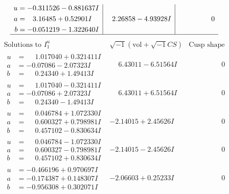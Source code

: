 \documentclass[1p]{elsarticle_modified}
\theoremstyle{definition}
\newcommand{\I}{\sqrt{-1}}
\begin{document}
$$\begin{array}{c|c|c}
\begin{aligned}
u &= -0.311526 - 0.881637 I \\
a &= \phantom{-}3.16485 + 0.52901 I \\
b &= -0.051219 - 1.322640 I\end{aligned}
 & \phantom{-}2.26858 - 4.93928 I & \phantom{-0.000000 } 0\\
 \hline 
 \end{array}$$\newpage$$\begin{array}{c|c|c}  
\text{Solutions to }I^u_{1}& \I (\text{vol} + \sqrt{-1}CS) & \text{Cusp shape}\\
 \hline 
\begin{aligned}
u &= \phantom{-}1.017040 + 0.321411 I \\
a &= -0.07086 - 2.07323 I \\
b &= \phantom{-}0.24340 + 1.49413 I\end{aligned}
 & \phantom{-}6.43011 - 6.51564 I & \phantom{-0.000000 } 0 \\ \hline\begin{aligned}
u &= \phantom{-}1.017040 - 0.321411 I \\
a &= -0.07086 + 2.07323 I \\
b &= \phantom{-}0.24340 - 1.49413 I\end{aligned}
 & \phantom{-}6.43011 + 6.51564 I & \phantom{-0.000000 } 0 \\ \hline\begin{aligned}
u &= \phantom{-}0.046784 + 1.072330 I \\
a &= \phantom{-}0.600327 + 0.798981 I \\
b &= \phantom{-}0.457102 - 0.830634 I\end{aligned}
 & -2.14015 + 2.45626 I & \phantom{-0.000000 } 0 \\ \hline\begin{aligned}
u &= \phantom{-}0.046784 - 1.072330 I \\
a &= \phantom{-}0.600327 - 0.798981 I \\
b &= \phantom{-}0.457102 + 0.830634 I\end{aligned}
 & -2.14015 - 2.45626 I & \phantom{-0.000000 } 0 \\ \hline\begin{aligned}
u &= -0.466196 + 0.970697 I \\
a &= -0.174387 + 0.148307 I \\
b &= -0.956308 + 0.302071 I\end{aligned}
 & -2.06603 + 0.25233 I & \phantom{-0.000000 } 0 \\ \hline\begin{aligned}

\end{aligned}
\end{array}$$
\end{document}
